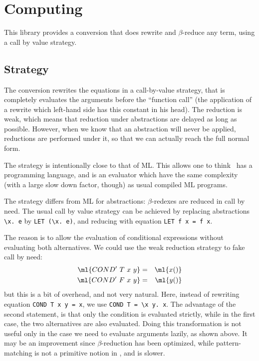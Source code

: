 
\chapter{Computing}

This library provides a conversion that does rewrite and
$\beta$-reduce any term, using a call by value strategy.


\section{Strategy}

The  conversion rewrites the equations in a call-by-value
strategy, that is completely evaluates the arguments before the
``function call'' (the application of a rewrite which left-hand side
has this constant in his head). The reduction is weak, which means
that reduction under abstractions are delayed as long as
possible. However, when we know that an abstraction will never be
applied, reductions are performed under it, so that we can actually
reach the full normal form.

The strategy is intentionally close to that of ML. This allows one to
think \HOL\ has a programming language, and  is an
evaluator which have the same complexity (with a large slow down factor,
though) as usual compiled ML programs.

The strategy differs from ML for abstractions: $\beta$-redexes are
reduced in call by need. The usual call by value strategy can be
achieved by replacing abstractions \verb#\x. e# by
\verb#LET (\x. e)#, and reducing  with equation
\verb#LET f x = f x#.

The reason is to allow the evaluation of conditional expressions
without evaluating both alternatives. We could use the weak reduction
strategy to fake call by need:
\begin{eqnarray*}
\ml{COND'~T~x~y} & = & \ml{x()} \\
\ml{COND'~F~x~y} & = & \ml{y()}
\end{eqnarray*}
but this is a bit of overhead, and not very natural. Here, instead of
rewriting equation \verb#COND T x y = x#, we use
\verb#COND T = \x y. x#. The advantage of the second statement, is
that only the condition is evaluated strictly, while in the first
case, the two alternatives are also evaluated. Doing this
transformation is not useful only in the case we need to evaluate
arguments lazily, as shown above. It may be an improvement since
$\beta$-reduction has been optimized, while pattern-matching is not a
primitive notion in \HOL, and is slower.



